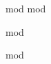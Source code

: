 \documentclass[
  10pt,       %
  twoside,    %
  a4paper,    %
  english,    %
  tikz,       %
  openright,  %
]{book}
\begin{document}
\frontmatter
{mod}
{mod}

\cleardoublepage

\begingroup
\hypersetup{linkcolor=black}
\tableofcontents
\endgroup

\cleardoublepage
\mainmatter
{mod}

\backmatter
{mod}
\end{document}
